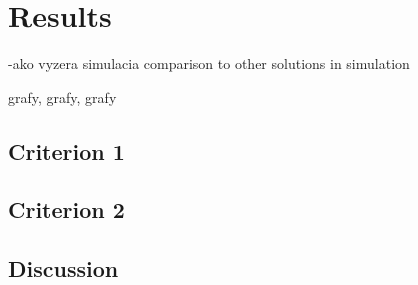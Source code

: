\chapter{Results}
\label{chap:sidh}
-ako vyzera simulacia
comparison to other solutions in simulation

grafy, grafy, grafy

\section{Criterion 1}
\section{Criterion 2}

\section{Discussion}